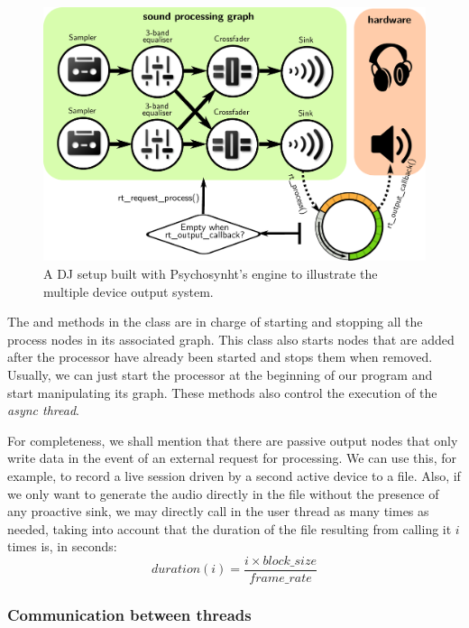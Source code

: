\begin{figure}[h!]
  \centering
  \includegraphics[width=\textwidth]{pic/djscheme.pdf}
  \caption{A DJ setup built with Psychosynht's engine to illustrate
    the multiple device output system.}
  \label{fig:djscheme}
\end{figure}

The  and  methods in the 
class are in charge of starting and stopping all the process nodes in
its associated graph. This class also starts nodes that are added
after the processor have already been started and stops them when
removed. Usually, we can just start the processor at the beginning of
our program and start manipulating its graph. These methods also
control the execution of the \emph{async thread}.

For completeness, we shall mention that there are
passive output nodes that only write data in the event of an external
request for processing. We can use this, for example, to record a live
session driven by a second active device to a file. Also, if we only
want to generate the audio directly in the file without the presence
of any proactive sink, we may directly call
 in the user thread as many times as
needed, taking into account that the duration of the file resulting
from calling it $i$ times is, in seconds:
\begin{equation}
  duration(i) = \frac{i \times block\_size}{frame\_rate}   
\end{equation}

\subsubsection{Communication between threads}

